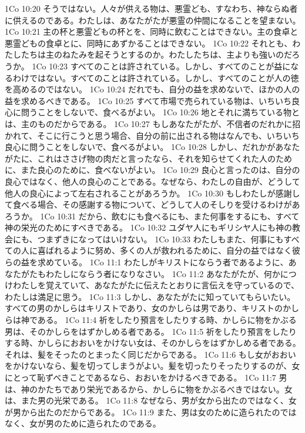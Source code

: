 1Co 10:20  そうではない。人々が供える物は、悪霊ども、すなわち、神ならぬ者に供えるのである。わたしは、あなたがたが悪霊の仲間になることを望まない。
1Co 10:21  主の杯と悪霊どもの杯とを、同時に飲むことはできない。主の食卓と悪霊どもの食卓とに、同時にあずかることはできない。
1Co 10:22  それとも、わたしたちは主のねたみを起そうとするのか。わたしたちは、主よりも強いのだろうか。
1Co 10:23  すべてのことは許されている。しかし、すべてのことが益になるわけではない。すべてのことは許されている。しかし、すべてのことが人の徳を高めるのではない。
1Co 10:24  だれでも、自分の益を求めないで、ほかの人の益を求めるべきである。
1Co 10:25  すべて市場で売られている物は、いちいち良心に問うことをしないで、食べるがよい。
1Co 10:26  地とそれに満ちている物とは、主のものだからである。
1Co 10:27  もしあなたがたが、不信者のだれかに招かれて、そこに行こうと思う場合、自分の前に出される物はなんでも、いちいち良心に問うことをしないで、食べるがよい。
1Co 10:28  しかし、だれかがあなたがたに、これはささげ物の肉だと言ったなら、それを知らせてくれた人のために、また良心のために、食べないがよい。
1Co 10:29  良心と言ったのは、自分の良心ではなく、他人の良心のことである。なぜなら、わたしの自由が、どうして他人の良心によって左右されることがあろうか。
1Co 10:30  もしわたしが感謝して食べる場合、その感謝する物について、どうして人のそしりを受けるわけがあろうか。
1Co 10:31  だから、飲むにも食べるにも、また何事をするにも、すべて神の栄光のためにすべきである。
1Co 10:32  ユダヤ人にもギリシヤ人にも神の教会にも、つまずきになってはいけない。
1Co 10:33  わたしもまた、何事にもすべての人に喜ばれるように努め、多くの人が救われるために、自分の益ではなく彼らの益を求めている。
1Co 11:1  わたしがキリストにならう者であるように、あなたがたもわたしにならう者になりなさい。
1Co 11:2  あなたがたが、何かにつけわたしを覚えていて、あなたがたに伝えたとおりに言伝えを守っているので、わたしは満足に思う。
1Co 11:3  しかし、あなたがたに知っていてもらいたい。すべての男のかしらはキリストであり、女のかしらは男であり、キリストのかしらは神である。
1Co 11:4  祈をしたり預言をしたりする時、かしらに物をかぶる男は、そのかしらをはずかしめる者である。
1Co 11:5  祈をしたり預言をしたりする時、かしらにおおいをかけない女は、そのかしらをはずかしめる者である。それは、髪をそったのとまったく同じだからである。
1Co 11:6  もし女がおおいをかけないなら、髪を切ってしまうがよい。髪を切ったりそったりするのが、女にとって恥ずべきことであるなら、おおいをかけるべきである。
1Co 11:7  男は、神のかたちであり栄光であるから、かしらに物をかぶるべきではない。女は、また男の光栄である。
1Co 11:8  なぜなら、男が女から出たのではなく、女が男から出たのだからである。
1Co 11:9  また、男は女のために造られたのではなく、女が男のために造られたのである。
